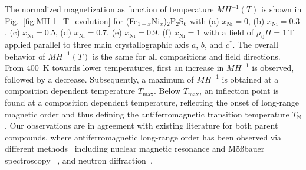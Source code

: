 \documentclass[twocolumn,superscriptaddress,prb,preprintnumbers,nobibnotes,aps]{revtex4-2}  %
\begin{document}
The normalized magnetization as function of temperature $MH^{-1}(T)$ is shown in Fig.~\ref{fig:MH-1_T_evolution} for (Fe$_{1-x}$Ni$_x$)$_2$P$_2$S$_6$ with (a) $x_\textrm{Ni} = 0$, (b) $x_\textrm{Ni} = 0.3$, (c) $x_\textrm{Ni} = 0.5$, (d) $x_\textrm{Ni} = 0.7$, (e) $x_\textrm{Ni} = 0.9$, (f) $x_\textrm{Ni} = 1$ with a field of $\mu_0H = 1$\,T applied parallel to three main crystallographic axis $a$, $b$, and $c^*$. The overall behavior of $MH^{-1}(T)$ is the same for all compositions and field directions. From 400~K towards lower temperatures, first an increase in $MH^{-1}$ is observed, followed by a decrease. Subsequently, a maximum of $MH^{-1}$ is obtained at a composition dependent temperature $T_\textrm{max}$. Below $T_\textrm{max}$, an inflection point is found at a composition dependent temperature, reflecting the onset of long-range magnetic order and thus defining the antiferromagnetic transition temperature $T_\textrm{N}$. Our observations are in agreement with existing literature for both parent compounds, where antiferromagnetic long-range order has been observed via different methods~\cite{PJoy1992,AWildes2015} including nuclear magnetic resonance and M{\"o}{\ss}bauer spectroscopy ~\cite{Dioguardi2020,CBerthier1978,Jernberg1984}, and neutron diffraction~\cite{AWildes2015,KKurosawa1983,KRule2007,DLancon2016}.
\end{document}
